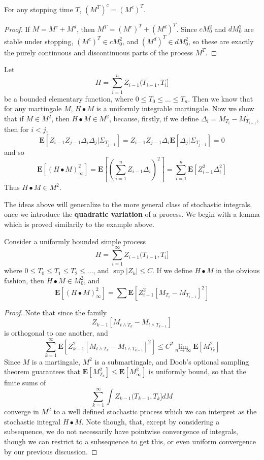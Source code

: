 \begin{theorem}
    For any stopping time $T$, $(M^T)^c = (M^c)^T$.
\end{theorem}
\begin{proof}
    If $M = M^c + M^d$, then $M^T = (M^c)^T + (M^d)^T$. Since $cM^2_0$ and $dM^2_0$ are stable under stopping, $(M^c)^T \in cM^2_0$, and $(M^d)^T \in dM^2_0$, so these are exactly the purely continuous and discontinuous parts of the process $M^T$.
\end{proof}

\begin{example}
    Let
    \[ H = \sum_{i = 1}^n Z_{i-1}(T_{i-1},T_i] \]
    be a bounded elementary function, where $0 \leq T_0 \leq \dots \leq T_n$. Then we know that for any martingale $M$, $H \bullet M$ is a uniformly integrable martingale. Now we show that if $M \in M^2$, then $H \bullet M \in M^2$, because, firstly, if we define $\Delta_i = M_{T_i} - M_{T_{i-1}}$, then for $i < j$,
    \[ \mathbf{E}[Z_{i-1} Z_{j-1} \Delta_i \Delta_j | \Sigma_{T_{j-1}}] = Z_{i-1} Z_{j-1} \Delta_i \mathbf{E}[\Delta_j | \Sigma_{T_{j-1}}] = 0 \]
    and so
    \[ \mathbf{E}[(H \bullet M)_\infty^2] = \mathbf{E} \left[ \left( \sum_{i = 1}^n Z_{i-1} \Delta_i \right)^2 \right] = \sum_{i = 1}^n \mathbf{E} [Z_{i-1}^2 \Delta_i^2] \]
    Thus $H \bullet M \in M^2$.
\end{example}

The ideas above will generalize to the more general class of stochastic integrals, once we introduce the {\bf quadratic variation} of a process. We begin with a lemma which is proved similarily to the example above.

\begin{lemma}
    Consider a uniformly bounded simple process
    \[ H = \sum_{i = 1}^\infty Z_{i-1} (T_{i-1},T_i] \]
    where $0 \leq T_0 \leq T_1 \leq T_2 \leq \dots$, and $\sup |Z_k| \leq C$. If we define $H \bullet M$ in the obvious fashion, then $H \bullet M \in M^2_0$, and
    \[ \mathbf{E}[(H \bullet M)_\infty^2] = \sum \mathbf{E}[Z_{i-1}^2[M_{T_i} - M_{T_{i-1}}]^2] \]
\end{lemma}
\begin{proof}
    Note that since the family
    \[ Z_{k-1} [M_{t \wedge T_k} - M_{t \wedge T_{k-1}}] \]
    is orthogonal to one another, and
    \[ \sum_{k = 1}^\infty \mathbf{E}[Z_{k-1}^2 [M_{t \wedge T_k} - M_{t \wedge T_{k-1}}]^2] \leq C^2 \lim_{n \to \infty} \mathbf{E}[M_{T_k}^2] \]
    Since $M$ is a martingale, $M^2$ is a submartingale, and Doob's optional sampling theorem guarantees that $\mathbf{E}[M_{T_k}^2] \leq \mathbf{E}[M_\infty^2]$ is uniformly bound, so that the finite sums of
    \[ \sum_{k = 1}^\infty \int Z_{k-1} (T_{k-1}, T_k] dM \]
    converge in $M^2$ to a well defined stochastic process which we can interpret as the stochastic integral $H \bullet M$. Note though, that, except by considering a subsequence, we do not necessarily have pointwise convergence of integrals, though we can restrict to a subsequence to get this, or even uniform convergence by our previous discussion.
\end{proof}

